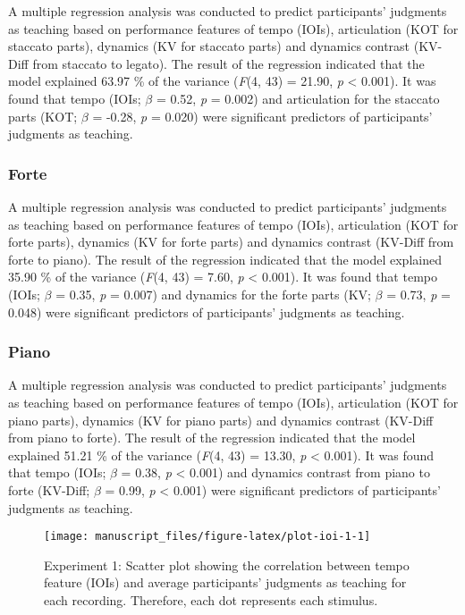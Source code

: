 \documentclass[
  man,floatsintext]{apa6}
\begin{document}
A multiple regression analysis was conducted to predict participants' judgments as teaching based on performance features of tempo (IOIs), articulation (KOT for staccato parts), dynamics (KV for staccato parts) and dynamics contrast (KV-Diff from staccato to legato). The result of the regression indicated that the model explained 63.97 \% of the variance (\emph{F}(4, 43) = 21.90, \emph{p} \textless{} 0.001). It was found that tempo (IOIs; \emph{\(\beta\)} = 0.52, \emph{p} = 0.002) and articulation for the staccato parts (KOT; \emph{\(\beta\)} = -0.28, \emph{p} = 0.020) were significant predictors of participants' judgments as teaching.

\hypertarget{forte}{%
\subsubsection{Forte}\label{forte}}

A multiple regression analysis was conducted to predict participants' judgments as teaching based on performance features of tempo (IOIs), articulation (KOT for forte parts), dynamics (KV for forte parts) and dynamics contrast (KV-Diff from forte to piano). The result of the regression indicated that the model explained 35.90 \% of the variance (\emph{F}(4, 43) = 7.60, \emph{p} \textless{} 0.001). It was found that tempo (IOIs; \emph{\(\beta\)} = 0.35, \emph{p} = 0.007) and dynamics for the forte parts (KV; \emph{\(\beta\)} = 0.73, \emph{p} = 0.048) were significant predictors of participants' judgments as teaching.

\hypertarget{piano}{%
\subsubsection{Piano}\label{piano}}

A multiple regression analysis was conducted to predict participants' judgments as teaching based on performance features of tempo (IOIs), articulation (KOT for piano parts), dynamics (KV for piano parts) and dynamics contrast (KV-Diff from piano to forte). The result of the regression indicated that the model explained 51.21 \% of the variance (\emph{F}(4, 43) = 13.30, \emph{p} \textless{} 0.001). It was found that tempo (IOIs; \emph{\(\beta\)} = 0.38, \emph{p} \textless{} 0.001) and dynamics contrast from piano to forte (KV-Diff; \emph{\(\beta\)} = 0.99, \emph{p} \textless{} 0.001) were significant predictors of participants' judgments as teaching.

\begin{figure}

{\centering \texttt{[image: manuscript\_files/figure-latex/plot-ioi-1-1]} 

}

\caption{\label{fig:ioi-1}Experiment 1: Scatter plot showing the correlation between tempo feature (IOIs) and average participants' judgments as teaching for each recording. Therefore, each dot represents each stimulus.}\label{fig:plot-ioi-1}
\end{figure}
\end{document}
